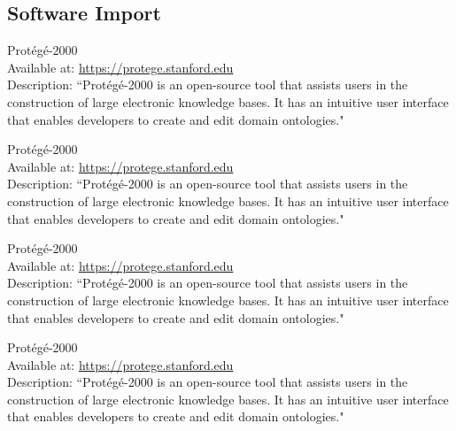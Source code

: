\subsection{Software Import}

\begin{software}
Prot{\'{e}}g{\'{e}}-2000~\cite{DBLP:conf/amia/NoyCFKTVM03}\\
Available at: \url{https://protege.stanford.edu}\\
Description: ``Prot\'{e}g\'{e}-2000 is an open-source tool that assists users in the construction of large electronic knowledge bases. It has an intuitive user interface that enables developers to create and edit domain ontologies."~\cite{DBLP:conf/amia/NoyCFKTVM03}
\label{software:protege0}
\end{software}
\begin{software}
Prot{\'{e}}g{\'{e}}-2000~\cite{DBLP:conf/amia/NoyCFKTVM03}\\
Available at: \url{https://protege.stanford.edu}\\
Description: ``Prot\'{e}g\'{e}-2000 is an open-source tool that assists users in the construction of large electronic knowledge bases. It has an intuitive user interface that enables developers to create and edit domain ontologies."~\cite{DBLP:conf/amia/NoyCFKTVM03}
\label{software:protege1}
\end{software}
\begin{software}
Prot{\'{e}}g{\'{e}}-2000~\cite{DBLP:conf/amia/NoyCFKTVM03}\\
Available at: \url{https://protege.stanford.edu}\\
Description: ``Prot\'{e}g\'{e}-2000 is an open-source tool that assists users in the construction of large electronic knowledge bases. It has an intuitive user interface that enables developers to create and edit domain ontologies."~\cite{DBLP:conf/amia/NoyCFKTVM03}
\label{software:protege2}
\end{software}
\begin{software}
Prot{\'{e}}g{\'{e}}-2000~\cite{DBLP:conf/amia/NoyCFKTVM03}\\
Available at: \url{https://protege.stanford.edu}\\
Description: ``Prot\'{e}g\'{e}-2000 is an open-source tool that assists users in the construction of large electronic knowledge bases. It has an intuitive user interface that enables developers to create and edit domain ontologies."~\cite{DBLP:conf/amia/NoyCFKTVM03}
\label{software:protege3}
\end{software}
